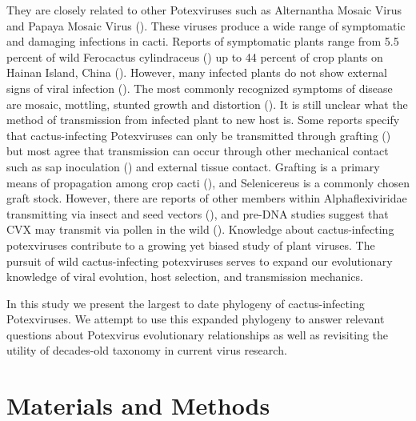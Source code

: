 \documentclass[11pt,letterpaper,titlepage]{article}
\begin{document}
\begin{linenumbers}
They are closely related to other Potexviruses such as Alternantha Mosaic Virus and Papaya Mosaic Virus (\cite{martelli_family_2007, park_detection_2018, liou_complete_2004}). 
These viruses produce a wide range of symptomatic and damaging infections in cacti. 
Reports of symptomatic plants range from 5.5 percent of wild Ferocactus cylindraceus (\cite{attathom_occurrence_1978}) up to 44 percent of crop plants on Hainan Island, China (\cite{peng_molecular_2016}). 
However, many infected plants do not show external signs of viral infection (\cite{liou_complete_2004, bos_symptoms_1977}). 
The most commonly recognized symptoms of disease are mosaic, mottling, stunted growth and distortion (\cite{maliarenko_cactus_2013, peng_molecular_2016, attathom_occurrence_1978}). 
It is still unclear what the method of transmission from infected plant to new host is. 
Some reports specify that cactus-infecting Potexviruses can only be transmitted through grafting (\cite{duarte_potexvirus_2008, martelli_family_2007}) but most agree that transmission can occur through other mechanical contact such as sap inoculation (\cite{liou_complete_2004, maliarenko_cactus_2013, park_detection_2018}) and external tissue contact. 
Grafting is a primary means of propagation among crop cacti (\cite{park_detection_2018}), and Selenicereus is a commonly chosen graft stock. 
However, there are reports of other members within Alphaflexiviridae transmitting via insect and seed vectors (\cite{martelli_family_2007}), and pre-DNA studies suggest that CVX may transmit via pollen in the wild (\cite{attathom_occurrence_1978}).
Knowledge about cactus-infecting potexviruses contribute to a growing yet biased study of plant viruses. 
The pursuit of wild cactus-infecting potexviruses serves to expand our evolutionary knowledge of viral evolution, host selection, and transmission mechanics. 

In this study we present the largest to date phylogeny of cactus-infecting Potexviruses. 
We attempt to use this expanded phylogeny to answer relevant questions about Potexvirus evolutionary relationships as well as revisiting the utility of decades-old taxonomy in current virus research. 

\section*{Materials and Methods}


\end{linenumbers}
\end{document}
